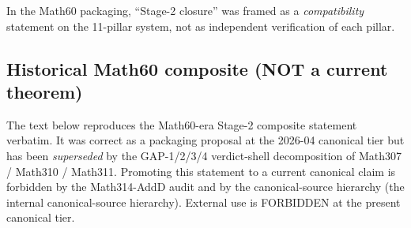 In the Math60 packaging, ``Stage-2 closure'' was framed as a
\emph{compatibility} statement on the 11-pillar system, not as
independent verification of each pillar.

\subsection{Historical Math60 composite (NOT a current theorem)}

\begin{remark}
\label{rmk:historical}
The text below reproduces the Math60-era Stage-2 composite statement
verbatim. It was correct as a packaging proposal at the
2026-04 canonical tier but has been \emph{superseded} by the
GAP-1/2/3/4 verdict-shell decomposition of Math307 / Math310 /
Math311. Promoting this statement to a current canonical claim is
forbidden by the Math314-AddD audit and by the canonical-source
hierarchy (the internal canonical-source hierarchy). External use is FORBIDDEN at the present
canonical tier.
\end{remark}


